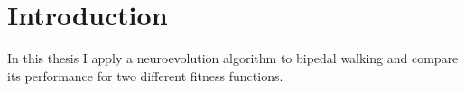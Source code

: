\section{Introduction}

\todo{}

\label{sec:intro}


In this thesis I apply a neuroevolution algorithm to bipedal walking and compare its performance for two different fitness functions.
\todo{}
